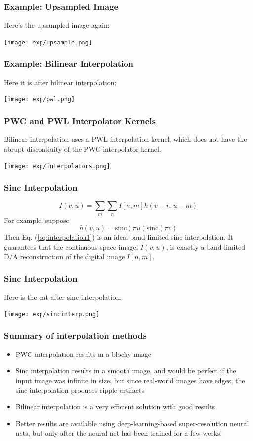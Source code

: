 \documentclass{beamer}
\begin{document}
\begin{frame}
  \frametitle{Example: Upsampled Image}

  Here's the upsampled image again:
  \centerline{\texttt{[image: exp/upsample.png]}}
\end{frame}

\begin{frame}
  \frametitle{Example: Bilinear Interpolation}

  Here it is after bilinear interpolation:
  \centerline{\texttt{[image: exp/pwl.png]}}
\end{frame}


\begin{frame}
  \frametitle{PWC and PWL Interpolator Kernels}

  Bilinear interpolation uses a PWL interpolation kernel, which does
  not have the abrupt discontiuity of the PWC interpolator kernel.
  \centerline{\texttt{[image: exp/interpolators.png]}}
\end{frame}


\begin{frame}
  \frametitle{Sinc Interpolation}
  \[
  I(v,u) = \sum_m\sum_n I[n,m] h(v-n,u-m)
  \]
  For example, suppose
  \[
  h(v,u) = \mbox{sinc}(\pi u)\mbox{sinc}(\pi v)
  \]
  Then Eq. (\ref{eq:interpolation1}) is an ideal band-limited sinc interpolation.
  It guarantees that the continuous-space image, $I(v,u)$, is exactly a band-limited
  D/A reconstruction of the digital image $I[n,m]$.
\end{frame}

\begin{frame}
  \frametitle{Sinc Interpolation}

  Here is the cat after sinc interpolation:
  \centerline{\texttt{[image: exp/sincinterp.png]}}
\end{frame}


\begin{frame}
  \frametitle{Summary of interpolation methods}

  \begin{itemize}
  \item PWC interpolation results in a blocky image
  \item Sinc interpolation results in a smooth image, and would be
    perfect if the input image was infinite in size, but since
    real-world images have edges, the sinc interpolation produces
    ripple artifacts
  \item Bilinear interpolation is a very efficient solution with good results
  \item Better results are available using deep-learning-based
    super-resolution neural nets, but only after the neural net has
    been trained for a few weeks!
  \end{itemize}
\end{frame}
\end{document}
